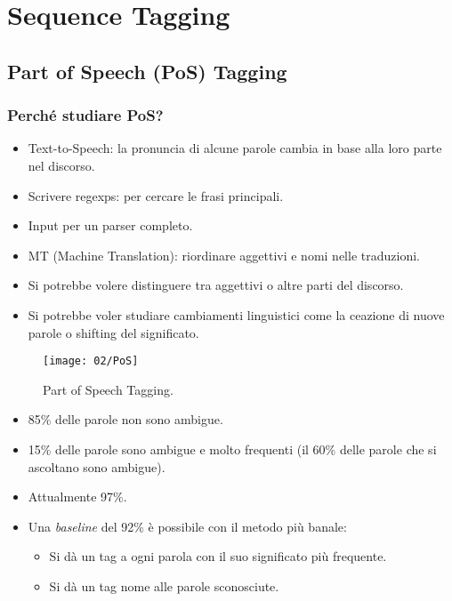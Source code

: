 \chapter{Sequence Tagging}

\section{Part of Speech (PoS) Tagging}


\subsection{Perché studiare PoS?}


\begin{itemize}
  \item Text-to-Speech: la pronuncia di alcune parole cambia in base alla loro parte nel discorso. 
  \item Scrivere regexps: per cercare le frasi principali. 
  \item Input per un parser completo. 
  \item MT (Machine Translation): riordinare aggettivi e nomi nelle traduzioni. 
  \item Si potrebbe volere distinguere tra aggettivi o altre parti del discorso. 
  \item Si potrebbe voler studiare cambiamenti linguistici come la ceazione di nuove parole o shifting del significato.
\end{itemize}

\begin{figure}[h]
    \centering
    \texttt{[image: 02/PoS]}
    \caption{Part of Speech Tagging.}
\end{figure}


\begin{itemize}
  \item 85\% delle parole non sono ambigue. 
  \item 15\% delle parole sono ambigue e molto frequenti (il 60\% delle parole che si ascoltano sono ambigue).
\end{itemize}


\begin{itemize}
  \item Attualmente 97\%. 
  \item Una \textit{baseline} del 92\% è possibile con il metodo più banale:
    \begin{itemize}
      \item Si dà un tag a ogni parola con il suo significato più frequente. 
      \item Si dà un tag nome alle parole sconosciute.
    \end{itemize}
\end{itemize}

